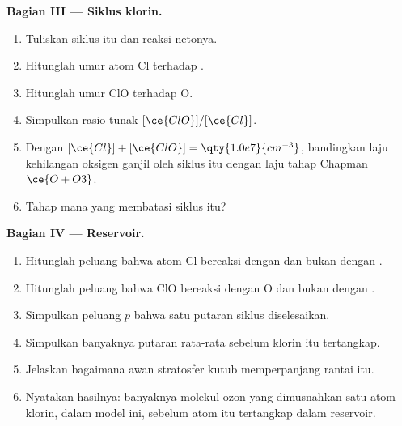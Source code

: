 \begin{problem}
\medskip\noindent\textbf{Bagian III --- Siklus klorin.}
\begin{enumerate}[resume, beginpenalty=10000]
  \item Tuliskan siklus itu dan reaksi netonya.
  \item Hitunglah umur atom Cl terhadap .
  \item Hitunglah umur ClO terhadap O.
  \item Simpulkan rasio tunak $[\ce{ClO}]/[\ce{Cl}]$.
  \item Dengan $[\ce{Cl}] + [\ce{ClO}] = \qty{1.0e7}{cm^{-3}}$, bandingkan laju
        kehilangan oksigen ganjil oleh siklus itu dengan laju tahap Chapman
        $\ce{O + O3}$.
  \item Tahap mana yang membatasi siklus itu?
\end{enumerate}

\medskip\noindent\textbf{Bagian IV --- Reservoir.}
\begin{enumerate}[resume, beginpenalty=10000]
  \item Hitunglah peluang bahwa atom Cl bereaksi dengan  dan bukan dengan
        .
  \item Hitunglah peluang bahwa ClO bereaksi dengan O dan bukan dengan
        .
  \item Simpulkan peluang $p$ bahwa satu putaran siklus diselesaikan.
  \item Simpulkan banyaknya putaran rata-rata sebelum klorin itu tertangkap.
  \item Jelaskan bagaimana awan stratosfer kutub memperpanjang rantai itu.
  \item Nyatakan hasilnya: banyaknya molekul ozon yang dimusnahkan satu atom
        klorin, dalam model ini, sebelum atom itu tertangkap dalam reservoir.
\end{enumerate}
\end{problem}
